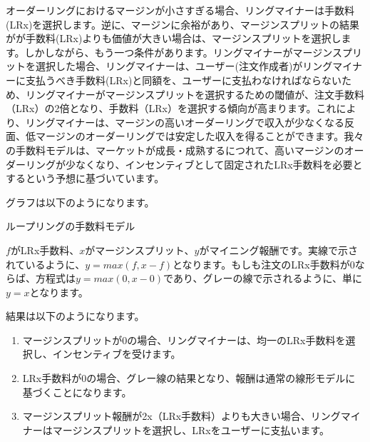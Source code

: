 \documentclass{article}
\makeatletter
\newenvironment{figurehere}
 {\def\@captype{figure}}
 {}
\makeatother
\begin{document}
\begin{multicols}{2}
オーダーリングにおけるマージンが小さすぎる場合、リングマイナーは手数料(LRx)を選択します。逆に、マージンに余裕があり、マージンスプリットの結果がが手数料(LRx)よりも価値が大きい場合は、マージンスプリットを選択します。しかしながら、もう一つ条件があります。リングマイナーがマージンスプリットを選択した場合、リングマイナーは、ユーザー(注文作成者)がリングマイナーに支払うべき手数料(LRx)と同額を、ユーザーに支払わなければならないため、リングマイナーがマージンスプリットを選択するための閾値が、注文手数料（LRx）の2倍となり、手数料（LRx）を選択する傾向が高まります。これにより、リングマイナーは、マージンの高いオーダーリングで収入が少なくなる反面、低マージンのオーダーリングでは安定した収入を得ることができます。我々の手数料モデルは、マーケットが成長・成熟するにつれて、高いマージンのオーダーリングが少なくなり、インセンティブとして固定されたLRx手数料を必要とするという予想に基づいています。


グラフは以下のようになります。

\begin{center}
\begin{figurehere}
\centering
{}
\caption{ループリングの手数料モデル}
\label{fig:feemodel}
\end{figurehere}
\end{center}


$f$がLRx手数料、$x$がマージンスプリット、$y$がマイニング報酬です。実線で示されているように、$y=max(f, x-f)$となります。もしも注文のLRx手数料が$0$ならば、方程式は$y=max(0, x - 0)$であり、グレーの線で示されるように、単に$y=x$となります。


結果は以下のようになります。  
\begin{enumerate}
	\item マージンスプリットが0の場合、リングマイナーは、均一のLRx手数料を選択し、インセンティブを受けます。 
	\item LRx手数料が0の場合、グレー線の結果となり、報酬は通常の線形モデルに基づくことになります。
	\item マージンスプリット報酬が2x（LRx手数料）よりも大きい場合、リングマイナーはマージンスプリットを選択し、LRxをユーザーに支払います。
\end{enumerate}


\end{multicols}
\end{document}
